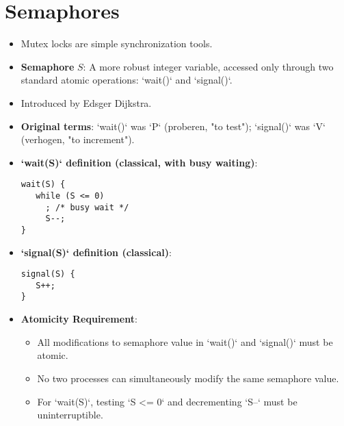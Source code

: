 \section{Semaphores}
\begin{itemize}
    \item Mutex locks are simple synchronization tools.
    \item \textbf{Semaphore} $S$: A more robust integer variable, accessed only through two standard atomic operations: `wait()` and `signal()`.
    \item Introduced by Edsger Dijkstra.
    \item \textbf{Original terms}: `wait()` was `P` (proberen, "to test"); `signal()` was `V` (verhogen, "to increment").
    \item \textbf{`wait(S)` definition (classical, with busy waiting)}:
\begin{verbatim}
wait(S) {
   while (S <= 0)
     ; /* busy wait */
     S--;
}
\end{verbatim}
    \item \textbf{`signal(S)` definition (classical)}:
\begin{verbatim}
signal(S) {
   S++;
}
\end{verbatim}
    \item \textbf{Atomicity Requirement}:
    \begin{itemize}
        \item All modifications to semaphore value in `wait()` and `signal()` must be atomic.
        \item No two processes can simultaneously modify the same semaphore value.
        \item For `wait(S)`, testing `S <= 0` and decrementing `S--` must be uninterruptible.
    \end{itemize}


\end{itemize}
